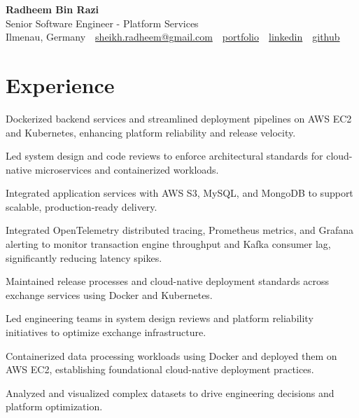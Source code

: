 \documentclass[10pt,a4paper]{resume}
\makeatletter
\newcommand{\Portfolio}{https://radheem.github.io/my-cv}
\newcommand{\PortfolioText}{portfolio}
\newcommand{\GitHub}{https://github.com/radheem}
\newcommand{\LinkedIn}{https://www.linkedin.com/in/radheem-razi}
\newcommand{\Email}{sheikh.radheem@gmail.com}
\makeatother
\begin{document}
\begin{center}
  {\huge\bfseries Radheem Bin Razi}\\[3pt]
  {\large Senior Software Engineer - Platform Services}\\[6pt]
  \small
  Ilmenau, Germany \,\textbar\,
  \href{mailto:\Email}{\Email} \,\textbar\,
  \href{\Portfolio}{\PortfolioText} \,\textbar\,
  \href{\LinkedIn}{linkedin} \,\textbar\,
  \href{\GitHub}{github}
\end{center}
\vspace{2pt}

\section{Experience}

\bullets
  \item Dockerized backend services and streamlined deployment pipelines on AWS EC2 and Kubernetes, enhancing platform reliability and release velocity.
  \item Led system design and code reviews to enforce architectural standards for cloud-native microservices and containerized workloads.
  \item Integrated application services with AWS S3, MySQL, and MongoDB to support scalable, production-ready delivery.
\bulletsend
\vspace{1.5pt}
\bullets
  \item Integrated OpenTelemetry distributed tracing, Prometheus metrics, and Grafana alerting to monitor transaction engine throughput and Kafka consumer lag, significantly reducing latency spikes.
  \item Maintained release processes and cloud-native deployment standards across exchange services using Docker and Kubernetes.
  \item Led engineering teams in system design reviews and platform reliability initiatives to optimize exchange infrastructure.
\bulletsend
\vspace{1.5pt}
\bullets
  \item Containerized data processing workloads using Docker and deployed them on AWS EC2, establishing foundational cloud-native deployment practices.
  \item Analyzed and visualized complex datasets to drive engineering decisions and platform optimization.
\bulletsend
\vspace{1.5pt}
\end{document}
